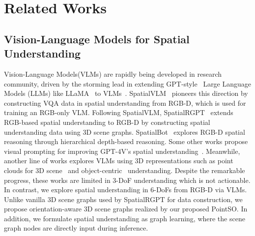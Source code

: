\section{Related Works}
\subsection{Vision-Language Models for Spatial Understanding}
Vision-Language Models(VLMs) are rapidly being developed in research community, driven by the storming lead in extending GPT-style~\cite{GPT1_18,GPT2_19,GPT3_20} Large Language Models (LLMs) like LLaMA~\cite{LLaMA23,LLaMA2_23} to VLMs~\cite{Flamingo22,LLaVA23,LLaVA1.523,DreamLLM23,Emu23,LLaMA-Adapter23,ChatSpot23,MolmoAndPixMo24,Cambrian24,PaLME23,LVM23}.
SpatialVLM~\cite{SpatialVLM24} pioneers this direction by constructing VQA data in spatial understanding from RGB-D, which is used for training an RGB-only VLM.
Following SpatialVLM, SpatialRGPT~\cite{SpatialRGPT24} extends RGB-based spatial understanding to RGB-D by constructing spatial understanding data using 3D scene graphs.
SpatialBot~\cite{SpatialBot24} explores RGB-D spatial reasoning through hierarchical depth-based reasoning.
Some other works propose visual prompting for improving GPT-4V's spatial understanding~\cite{3DAxiesPrompts23,SoM23,SpatialPIN24}.
Meanwhile, another line of works explores VLMs using 3D representations such as point clouds for 3D scene~\cite{3DLLM23,SceneLLM24} and object-centric~\cite{ShapeLLM24,pointllm23,GPT4Point24} understanding.
Despite the remarkable progress, these works are limited in 3-DoF understanding which is not actionable.
In contrast, we explore spatial understanding in 6-DoFs from RGB-D via VLMs.
Unlike vanilla 3D scene graphs used by SpatialRGPT for data construction, we propose orientation-aware 3D scene graphs realized by our proposed PointSO.
In addition, we formulate spatial understanding as graph learning, where the scene graph nodes are directly input during inference.

